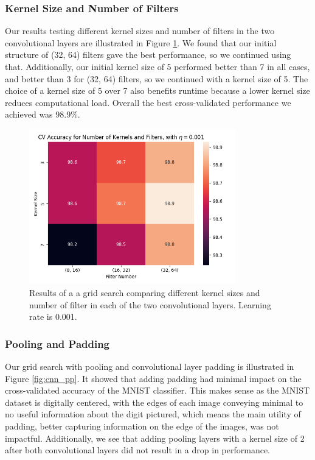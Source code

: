 \subsubsection{Kernel Size and Number of Filters}
Our results testing different kernel sizes and number of filters in the two convolutional layers are illustrated in Figure \ref{fig:cnn_kf}. We found that our initial structure of (32, 64) filters gave the best performance, so we continued using that. Additionally, our initial kernel size of 5 performed better than 7 in all cases, and better than 3 for (32, 64) filters, so we continued with a kernel size of 5. The choice of a kernel size of 5 over 7 also benefits runtime because a lower kernel size reduces computational load. Overall the best cross-validated performance we achieved was 98.9\%.
\begin{figure}[H]
    \centering
    \includegraphics[width=0.8\textwidth]{results/cnn_grid_search/heatmap_grid_search_kf.png}
    \caption{Results of a a grid search comparing different kernel sizes and number of filter in each of the two convolutional layers. Learning rate is 0.001.}
    \label{fig:cnn_kf}
\end{figure}

\newpage
\subsubsection{Pooling and Padding}
Our grid search with pooling and convolutional layer padding is illustrated in Figure \ref{fig:cnn_pp}. It showed that adding padding had minimal impact on the cross-validated accuracy of the MNIST classifier. This makes sense as the MNIST dataset is digitally centered, with the edges of each image conveying minimal to no useful information about the digit pictured, which means the main utility of padding, better capturing information on the edge of the images, was not impactful. Additionally, we see that adding pooling layers with a kernel size of 2 after both convolutional layers did not result in a drop in performance.

